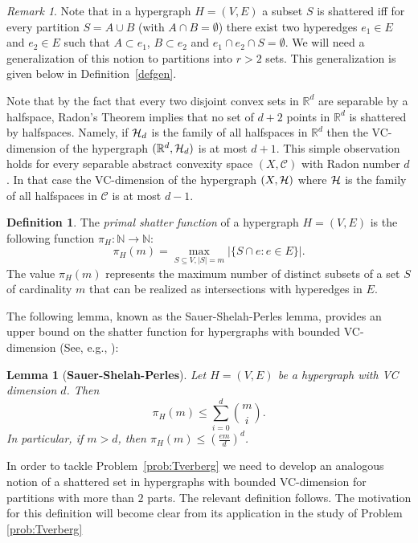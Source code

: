 \documentclass[11pt]{article}
\def\Re{\mathbb R}
\theoremstyle{plain}
\newtheorem{lemma}[theorem]{Lemma}
\theoremstyle{definition}
\newtheorem{definition}[theorem]{Definition}
\theoremstyle{remark}
\newtheorem{remark}[theorem]{Remark}
\newcommand{\calC}{\mathcal{C}}
\begin{document}
\begin{remark}
    Note that in a hypergraph $H=(V,E)$ a subset $S$ is shattered iff 
for every partition $S = A \cup B$ (with $A \cap B = \emptyset$) 
	there exist two hyperedges $e_1 \in E$ and $e_2 \in E$ such that $A \subset e_1$, $B \subset e_2$ and $e_1\cap e_2 \cap S = \emptyset$. 
	We will need a generalization of this notion to partitions 
	into $r>2$ sets. This generalization is given 
	below in Definition~\ref{defgen}.
\end{remark}

Note that by the fact that every two disjoint convex sets in $\Re^d$ are separable by  a halfspace, Radon's Theorem implies that no set of $d+2$ points in $\Re^d$ is shattered by halfspaces. Namely, if ${\cal H}_d$ is the family of all halfspaces in $\Re^d$ then the VC-dimension of the hypergraph $(\Re^d,{\cal H}_d)$ is at most $d+1$.
This simple observation holds for every separable abstract convexity space $(X,\calC)$ with Radon number $d$. In that case the VC-dimension of the hypergraph $(X,\cal H)$ where $\cal H$ is the family of all halfspaces in $\calC$ is at most $d-1$.

 \begin{definition}

The \emph{primal shatter function} of a hypergraph $H = (V, E)$ is
the following function $\pi_H : \mathbb{N} \rightarrow \mathbb{N}$:
\[
\pi_H(m) = \max_{S \subseteq V, |S| = m} |\{ S \cap e : e \in E \}|.
\]
 The value $\pi_H(m)$ represents the maximum number of distinct subsets
 of a set $S$ of cardinality $m$ that can be realized as intersections
 with hyperedges in $E$.
 \end{definition}

The following lemma, known as the Sauer-Shelah-Perles  lemma, provides
an upper bound on the shatter function for hypergraphs with bounded
VC-dimension (See, e.g., \cite{MATOUSEK}):
\begin{lemma}[{\bf Sauer-Shelah-Perles}]
    \label{Lem:Perles-Sauer-Shelah}
    Let $H = (V, E)$ be a hypergraph with 
VC dimension $d$. Then
\[
\pi_H(m) \leq \sum_{i=0}^{d} \binom{m}{i}.
\]
In particular, if $m > d$, then $\pi_H(m) \leq (\frac{em}{d})^d$.
\end{lemma}

In order to tackle Problem~\ref{prob:Tverberg} we need to
develop an analogous notion of a shattered set in hypergraphs with
bounded VC-dimension for partitions with more than $2$ parts. The relevant 
definition follows. The motivation for this definition will become clear from its application in the study of Problem 
\ref{prob:Tverberg}
\end{document}
